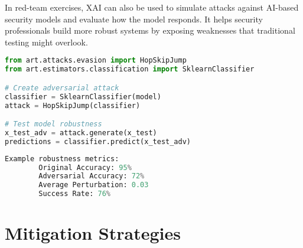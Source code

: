 \documentclass[12pt]{article}
\begin{document}
    \vspace{1em}


In red-team exercises, XAI can also be used to simulate attacks against AI-based security models and evaluate how the model responds. It helps security professionals build more robust systems by exposing weaknesses that traditional testing might overlook.

\begin{tcolorbox}[colback=black!90!white, colframe=orange!40!black, title=Example Code for Model Robustness Testing, coltext=white]
    \begin{lstlisting}[language=Python, basicstyle=\ttfamily\color{white}, keywordstyle=\color{cyan}, commentstyle=\color{blue}, stringstyle=\color{yellow}]
from art.attacks.evasion import HopSkipJump
from art.estimators.classification import SklearnClassifier

# Create adversarial attack
classifier = SklearnClassifier(model)
attack = HopSkipJump(classifier)

# Test model robustness
x_test_adv = attack.generate(x_test)
predictions = classifier.predict(x_test_adv)
    \end{lstlisting}
    \end{tcolorbox}
    
    \vspace{1em}
    
    \begin{tcolorbox}[colback=black!90!white, colframe=orange!40!black, title=Robustness Metrics, coltext=white]
    \begin{lstlisting}[language=Python, basicstyle=\ttfamily\color{white}, commentstyle=\color{white}]
        Example robustness metrics:
        Original Accuracy: 95%
        Adversarial Accuracy: 72%
        Average Perturbation: 0.03
        Success Rate: 76%
    \end{lstlisting}
    \end{tcolorbox}




\section{Mitigation Strategies}
\end{document}
